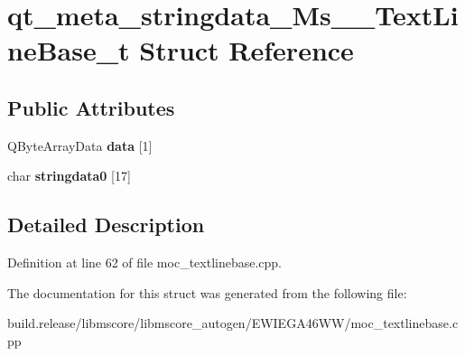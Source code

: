 \hypertarget{structqt__meta__stringdata___ms_____text_line_base__t}{}\section{qt\+\_\+meta\+\_\+stringdata\+\_\+\+Ms\+\_\+\+\_\+\+Text\+Line\+Base\+\_\+t Struct Reference}
\label{structqt__meta__stringdata___ms_____text_line_base__t}
\subsection*{Public Attributes}
\begin{DoxyCompactItemize}
\item 
\mbox{\label{structqt__meta__stringdata___ms_____text_line_base__t_a54c59d1bbc6ec2218ac670ccb9b908ed}} 
Q\+Byte\+Array\+Data {\bfseries data} \mbox{[}1\mbox{]}
\item 
\mbox{\label{structqt__meta__stringdata___ms_____text_line_base__t_a6bb6e7488ccf14640e8ebb102b30cddd}} 
char {\bfseries stringdata0} \mbox{[}17\mbox{]}
\end{DoxyCompactItemize}


\subsection{Detailed Description}


Definition at line 62 of file moc\+\_\+textlinebase.\+cpp.



The documentation for this struct was generated from the following file\+:\begin{DoxyCompactItemize}
\item 
build.\+release/libmscore/libmscore\+\_\+autogen/\+E\+W\+I\+E\+G\+A46\+W\+W/moc\+\_\+textlinebase.\+cpp\end{DoxyCompactItemize}
